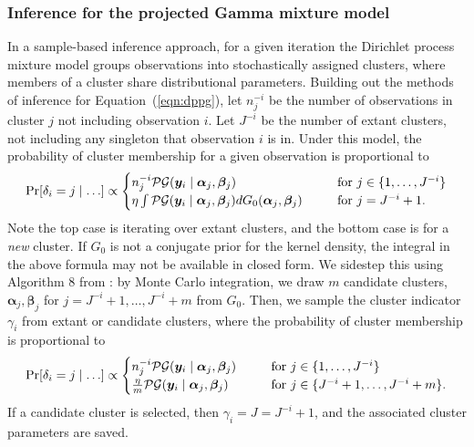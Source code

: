 \subsubsection{Inference for the projected Gamma mixture model}
In a sample-based inference approach, for a given iteration the Dirichlet process mixture model groups observations
    into stochastically assigned clusters, where members of a cluster share distributional parameters. Building out 
    the methods of inference for Equation~(\ref{eqn:dppg}), 
    let $n_j^{-i}$ be the number of observations in cluster $j$ not including observation $i$.  Let $J^{-i}$ be 
    the number of extant clusters, not including any singleton that observation $i$ is in. Under this model, 
    the probability of cluster membership for a given observation is proportional to
\begin{equation*}
    \text{Pr}\left[\delta_i = j\mid\ldots\right] \propto \begin{cases}
        n_j^{-i}\mathcal{PG}\left(\bm{y}_i\mid\bm{\alpha}_j,\bm{\beta}_j\right)\hspace{0.5cm} &\text{~for~}j \in \lbrace 1,\ldots,J^{-i}\rbrace\\
        \eta\int\mathcal{PG}\left(\bm{y}_i\mid\bm{\alpha}_j,\bm{\beta}_j\right)dG_0(\bm{\alpha}_j,\bm{\beta}_j)\hspace{0.5cm} &\text{~for~}j = J^{-i} + 1.
        \end{cases}
\end{equation*}
Note the top case is iterating over extant clusters, and the bottom case is for a \emph{new} cluster. 
If $G_0$ is not a conjugate prior for the kernel density, the integral in the above formula may not be
available in closed form. We sidestep this using Algorithm 8 from \cite{neal2000}: by Monte Carlo integration, 
we draw $m$ candidate clusters, $\bm{\alpha}_j,\bm{\beta}_j$ for $j = J^{-i} + 1,\ldots, J^{-i} + m$ from $G_0$. 
Then, we sample the cluster indicator $\gamma_i$ from extant or candidate clusters, where
the probability of cluster membership is proportional to
\begin{equation}
    \text{Pr}\left[\delta_i = j\mid\ldots\right] \propto \begin{cases}
        n_j^{-i}\mathcal{PG}\left(\bm{y}_i\mid\bm{\alpha}_j,\bm{\beta}_j\right)\hspace{0.5cm} &\text{~for~}j \in \lbrace 1,\ldots,J^{-i}\rbrace\\
        \frac{\eta}{m}\mathcal{PG}\left(\bm{y}_i\mid\bm{\alpha}_j,\bm{\beta}_j\right)\hspace{0.5cm} &\text{~for~}j \in \lbrace J^{-i} + 1,\ldots, J^{-i} + m\rbrace.
        \end{cases}
\end{equation}
If a candidate cluster is selected,
then $\gamma_i = J = J^{- i} + 1$, and the associated cluster parameters are saved.

